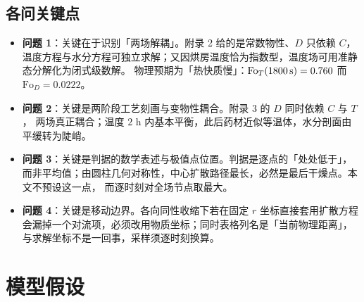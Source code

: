 \documentclass[withoutpreface,bwprint]{cumcmthesis}
\begin{document}
\subsection{各问关键点}

\begin{itemize}[leftmargin=1.7em,itemsep=2pt]
\item \textbf{问题 1}：关键在于识别「两场解耦」。附录 2 给的是常数物性、$D$ 只依赖 $C$，
温度方程与水分方程可独立求解；又因烘房温度恰为指数型，温度场可用准静态分解化为闭式级数解。
物理预期为「热快质慢」：$\mathrm{Fo}_T(1800\,{\rm s})=0.760$ 而 $\mathrm{Fo}_D=0.0222$。
\item \textbf{问题 2}：关键是两阶段工艺刻画与变物性耦合。附录 3 的 $D$ 同时依赖 $C$ 与 $T$，
两场真正耦合；温度 $2$ h 内基本平衡，此后药材近似等温体，水分剖面由平缓转为陡峭。
\item \textbf{问题 3}：关键是判据的数学表述与极值点位置。判据是逐点的「处处低于」，
而非平均值；由圆柱几何对称性，中心扩散路径最长，必然是最后干燥点。本文不预设这一点，
而逐时刻对全场节点取最大。
\item \textbf{问题 4}：关键是移动边界。各向同性收缩下若在固定 $r$ 坐标直接套用扩散方程
会漏掉一个对流项，必须改用物质坐标；同时表格列名是「当前物理距离」，
与求解坐标不是一回事，采样须逐时刻换算。
\end{itemize}

\section{模型假设}
\end{document}

